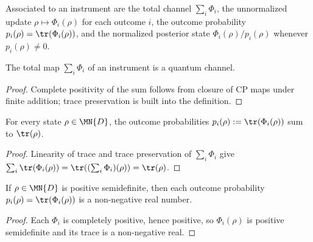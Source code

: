 \begin{definition}\label{def:instrument_operations}
    \leanok
    Associated to an instrument are the total channel $\sum_i \Phi_i$, the
    unnormalized update $\rho \mapsto \Phi_i(\rho)$ for each outcome $i$, the
    outcome probability $p_i(\rho) = \tr(\Phi_i(\rho))$, and the normalized
    posterior state $\Phi_i(\rho) / p_i(\rho)$ whenever $p_i(\rho) \neq 0$.
\end{definition}

\begin{theorem}
    \label{thm:instrument_total_is_channel}
    \leanok
    The total map $\sum_i \Phi_i$ of an instrument is a quantum channel.
\end{theorem}

\begin{proof}
    \leanok
    Complete positivity of the sum follows from closure of CP maps under
    finite addition; trace preservation is built into the definition.
\end{proof}

\begin{theorem}
    \label{thm:instrument_sum_probability}
    \leanok
    For every state $\rho \in \MN{D}$, the outcome probabilities
    $p_i(\rho) := \tr(\Phi_i(\rho))$ sum to $\tr(\rho)$.
\end{theorem}

\begin{proof}
    \leanok
    Linearity of trace and trace preservation of $\sum_i \Phi_i$ give
    $\sum_i \tr(\Phi_i(\rho)) = \tr((\sum_i \Phi_i)(\rho))
        = \tr(\rho)$.
\end{proof}

\begin{theorem}
    \label{thm:instrument_probability_nonneg}
    \leanok
    If $\rho \in \MN{D}$ is positive semidefinite, then each outcome
    probability $p_i(\rho) = \tr(\Phi_i(\rho))$ is a
    non-negative real number.
\end{theorem}

\begin{proof}
    \leanok
    Each $\Phi_i$ is completely positive, hence positive, so
    $\Phi_i(\rho)$ is positive semidefinite and its trace is a
    non-negative real.
\end{proof}

